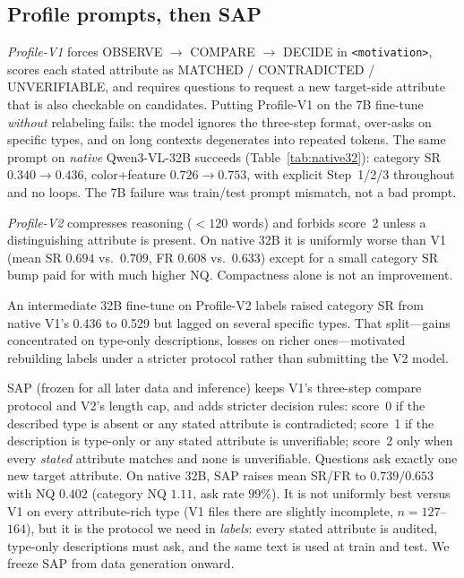 \documentclass[10pt,a4paper]{article}
\begin{document}
\subsection{Profile prompts, then SAP}
\emph{Profile-V1} forces OBSERVE $\rightarrow$ COMPARE $\rightarrow$
DECIDE in \texttt{<motivation>}, scores each stated attribute as
MATCHED / CONTRADICTED / UNVERIFIABLE, and requires questions to
request a new target-side attribute that is also checkable on
candidates. Putting Profile-V1 on the 7B fine-tune \emph{without}
relabeling fails: the model ignores the three-step format, over-asks
on specific types, and on long contexts degenerates into repeated
tokens. The same prompt on \emph{native} Qwen3-VL-32B succeeds
(Table~\ref{tab:native32}): category SR $0.340\rightarrow 0.436$,
color+feature $0.726\rightarrow 0.753$, with explicit Step~1/2/3
throughout and no loops. The 7B failure was train/test prompt
mismatch, not a bad prompt.

\emph{Profile-V2} compresses reasoning ($<120$ words) and forbids
score~2 unless a distinguishing attribute is present. On native 32B it
is uniformly worse than V1 (mean SR $0.694$ vs.\ $0.709$, FR $0.608$
vs.\ $0.633$) except for a small category SR bump paid for with much
higher NQ. Compactness alone is not an improvement.

An intermediate 32B fine-tune on Profile-V2 labels raised category SR
from native V1's 0.436 to 0.529 but lagged on several specific types.
That split---gains concentrated on type-only descriptions, losses on
richer ones---motivated rebuilding labels under a stricter protocol
rather than submitting the V2 model.

SAP (frozen for all later data and inference) keeps V1's three-step
compare protocol and V2's length cap, and adds stricter decision
rules: score~0 if the described type is absent or any stated attribute
is contradicted; score~1 if the description is type-only or any stated
attribute is unverifiable; score~2 only when every \emph{stated}
attribute matches and none is unverifiable. Questions ask exactly one
new target attribute. On native 32B, SAP raises mean SR/FR to
$0.739/0.653$ with NQ $0.402$ (category NQ $1.11$, ask rate $99\%$).
It is not uniformly best versus V1 on every attribute-rich type (V1
files there are slightly incomplete, $n=127$--$164$), but it is the
protocol we need in \emph{labels}: every stated attribute is audited,
type-only descriptions must ask, and the same text is used at train
and test. We freeze SAP from data generation onward.
\end{document}
